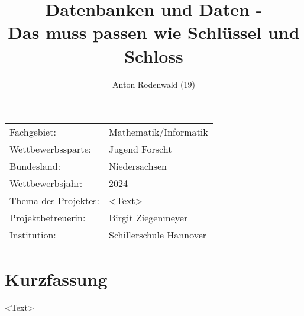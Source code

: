\documentclass[11pt,a4paper]{article}
\begin{document}
\title{Datenbanken und Daten - \\ Das muss passen wie Schlüssel und Schloss}
\author{Anton Rodenwald (19)}
\maketitle

\addtocounter{page}{-4}
\thispagestyle{empty}

\large
\begin{tabular}{l p{12cm}}

    Fachgebiet:          & Mathematik/Informatik   \\

    Wettbewerbssparte:   & Jugend Forscht          \\

    Bundesland:          & Niedersachsen           \\

    Wettbewerbsjahr:     & 2024                    \\

    Thema des Projektes: & <Text>                  \\

    Projektbetreuerin:   & Birgit Ziegenmeyer      \\

    Institution:         & Schillerschule Hannover \\
\end{tabular}

\clearpage

\pagestyle{empty}


\section*{Kurzfassung}

<Text>

\clearpage


\renewcommand*\contentsname{Inhaltsverzeichnis}

\renewcommand{\cftdot}{}

\tableofcontents

\clearpage

\pagestyle{plain}



\clearpage
\end{document}
